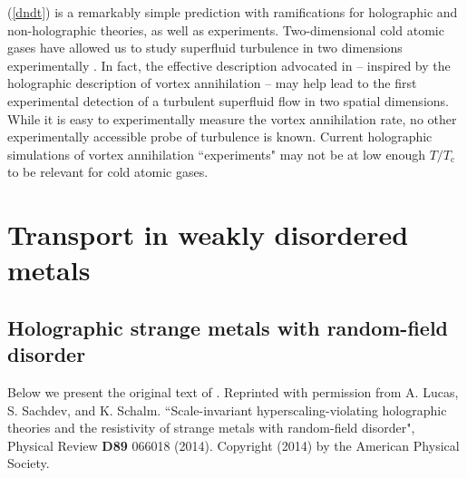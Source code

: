 \documentclass[10pt, oneside]{book}
\begin{document}
\begin{doublespace}
(\ref{dndt}) is a remarkably simple prediction with ramifications for holographic and non-holographic theories, as well as experiments.   Two-dimensional cold atomic gases have allowed us to study superfluid turbulence in two dimensions experimentally \cite{neely, kwon}.  In fact, the effective description advocated in \cite{Chesler:2014pka} -- inspired by the holographic description of vortex annihilation -- may help lead to the first experimental detection of a turbulent superfluid flow in two spatial dimensions.   While it is easy to experimentally measure the vortex annihilation rate, no other experimentally accessible probe of turbulence is known.   Current holographic simulations of vortex annihilation ``experiments" \cite{Du:2014lwa} may not be at low enough $T/T_{\mathrm{c}}$ to be relevant for cold atomic gases.   







\part{Transport in weakly disordered metals}


\chapter{Holographic strange metals with random-field disorder}

\newcommand{\cQ}{\mathcal{Q}}

Below we present the original text of \cite{lucas1401}.   Reprinted with permission from A. Lucas, S. Sachdev, and K. Schalm.  ``Scale-invariant hyperscaling-violating holographic theories and the resistivity of strange metals with random-field disorder",  Physical Review \textbf{D89} 066018 (2014).   Copyright (2014) by the American Physical Society.


\end{doublespace}
\end{document}

